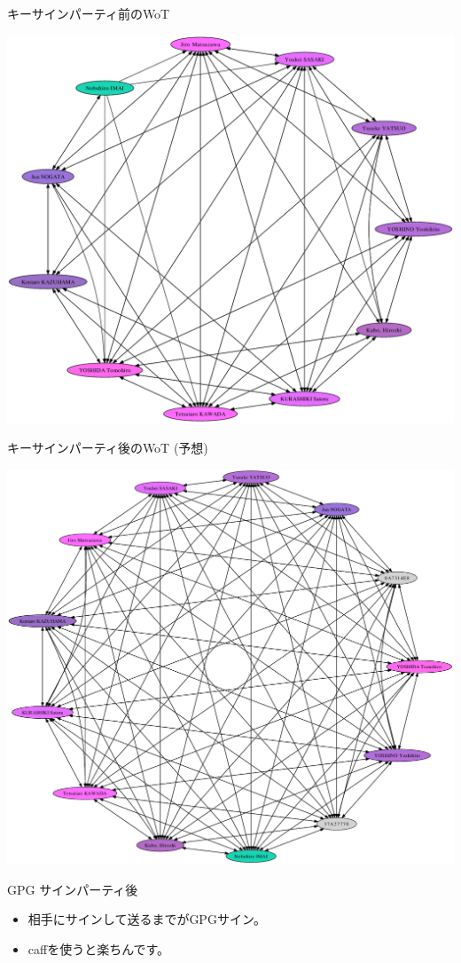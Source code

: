 \documentclass[cjk,dvipdfmx,12pt,compress]{beamer}
\begin{document}
\begin{frame}{キーサインパーティ前のWoT}
\begin{center}
\includegraphics[width=0.8\hsize]{image201211/ksp-before.png}
\end{center}
\end{frame}


\begin{frame}{キーサインパーティ後のWoT (予想)}
\begin{center}
\includegraphics[width=0.8\hsize]{image201211/ksp-after.png}
\end{center}
\end{frame}

\begin{frame}{GPG サインパーティ後}

  \begin{itemize}
  \item 相手にサインして送るまでがGPGサイン。
  \item \alert{caff}を使うと楽ちんです。
  \end{itemize}

\end{frame}
\end{document}
